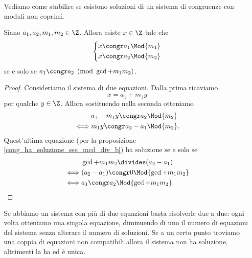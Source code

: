 Vediamo come stabilire se esistono soluzioni di un sistema di congruenze con moduli non coprimi.

\begin{proposition}
    Siano $a_1, a_2, m_1, m_2 \in \Z$. Allora esiste $x \in \Z$ tale che 
    \begin{equation*}
        \left\{
        \begin{alignedat}{1}
            x&\congr a_1 \Mod{m_1}\\
            x&\congr a_2 \Mod{m_2}
        \end{alignedat}      
        \right . 
    \end{equation*}
    se e solo se $a_1 \congr a_2 \pmod{\gcd{m_1}{m_2}}$.
\end{proposition}
\begin{proof}
    Consideriamo il sistema di due equazioni. Dalla prima ricaviamo \[
        x = a_1 + m_1y    
    \] per qualche $y \in \Z$. Allora sostituendo nella seconda otteniamo \begin{alignat*}
        {1}
        &a_1+m_1y \congr a_2 \Mod{m_2}\\
        \iff &m_1y \congr a_2 - a_1 \Mod{m_2}.
    \end{alignat*}
    Quest'ultima equazione (per la proposizione \ref{cong_ha_soluzione_sse_mcd_div_b}) ha soluzione se e solo se 
    \begin{alignat*}
        {1}
        &\gcd{m_1}{m_2} \divides (a_2-a_1) \\
        \iff &(a_2-a_1) \congr 0 \Mod{\gcd{m_1}{m_2}} \\
        \iff &a_1 \congr a_2 \Mod{\gcd{m_1}{m_2}}. \tag*{\qedhere}
    \end{alignat*}
\end{proof}

Se abbiamo un sistema con più di due equazioni basta risolverle due a due: ogni volta otteniamo una singola equazione, diminuendo di uno il numero di equazioni del sistema senza alterare il numero di soluzioni. Se a un certo punto troviamo una coppia di equazioni non compatibili allora il sistema non ha soluzione, altrimenti la ha ed è unica.

